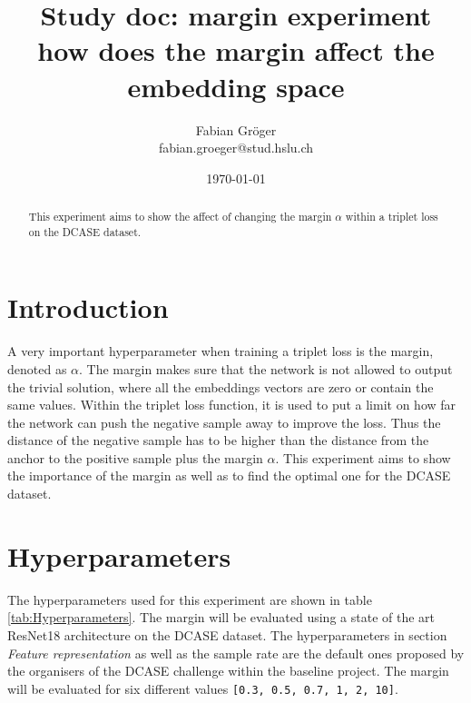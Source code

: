 \documentclass[twocolumn]{article}
\title{\huge{\textbf{Study doc: margin experiment}}\\ \normalsize \Large{how does the margin affect the embedding space}}
\author{Fabian Gröger\\fabian.groeger@stud.hslu.ch}
\date{\today}
\begin{document}
\maketitle

\begin{abstract}
This experiment aims to show the affect of changing the margin $\alpha$ within a triplet loss on the DCASE dataset.
\end{abstract}


\section{Introduction}
A very important hyperparameter when training a triplet loss is the margin, denoted as $\alpha$. The margin makes sure that the network is not allowed to output the trivial solution, where all the embeddings vectors are zero or contain the same values. Within the triplet loss function, it is used to put a limit on how far the network can push the negative sample away to improve the loss. Thus the distance of the negative sample has to be higher than the distance from the anchor to the positive sample plus the margin $\alpha$. This experiment aims to show the importance of the margin as well as to find the optimal one for the DCASE dataset.

\section{Hyperparameters}
The hyperparameters used for this experiment are shown in table \ref{tab:Hyperparameters}. The margin will be evaluated using a state of the art ResNet18 architecture on the DCASE dataset. The hyperparameters in section \textit{Feature representation} as well as the sample rate are the default ones proposed by the organisers of the DCASE challenge within the baseline project. The margin will be evaluated for six different values \texttt{[0.3, 0.5, 0.7, 1, 2, 10]}.
\end{document}

